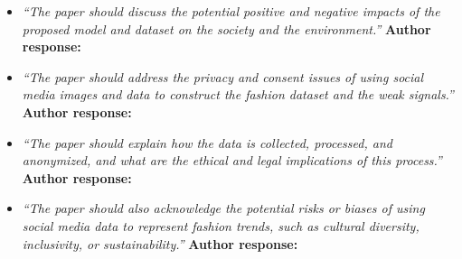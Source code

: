 \documentclass[10pt]{article} %
\begin{document}
\begin{itemize}
	\item {\em ``The paper should discuss the potential positive and negative impacts of the proposed model and dataset on the society and the environment.''} \medskip
	\textbf{Author response:} \\
	
	\item {\em ``The paper should address the privacy and consent issues of using social media images and data to construct the fashion dataset and the weak signals.''} \medskip
	\textbf{Author response:} \\
	
	\item {\em ``The paper should explain how the data is collected, processed, and anonymized, and what are the ethical and legal implications of this process.''} \medskip
	\textbf{Author response:} \\
	
	\item {\em ``The paper should also acknowledge the potential risks or biases of using social media data to represent fashion trends, such as cultural diversity, inclusivity, or sustainability.''} \medskip
	\textbf{Author response:} \\	
\end{itemize}



\end{document}
